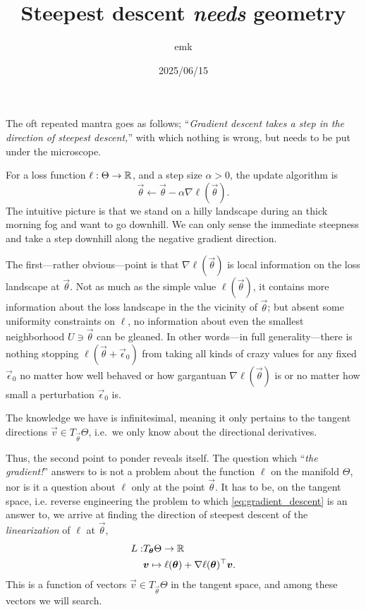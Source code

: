\documentclass[12pt]{amsart}
\title{Steepest descent \emph{needs} geometry}
\author{emk}
\date{2025/06/15}
\begin{document}
\maketitle

The oft repeated mantra goes as follows; ``\emph{Gradient descent takes a step in the direction of steepest descent,}'' with which nothing is wrong, but needs to be put under the microscope.

For a loss function $\ell : \Theta \to \mathbb{R}$, and a step size $\alpha > 0$, the update algorithm is
\begin{equation}\label{eq:gradient_descent}
	\vec{\theta} \leftarrow \vec{\theta} - \alpha \nabla \ell(\vec{\theta}).
\end{equation}
The intuitive picture is that we stand on a hilly landscape during an thick morning fog and want to go downhill. We can only sense the immediate steepness and take a step downhill along the negative gradient direction. 

The first---rather obvious---point is that $\nabla \ell(\vec{\theta})$ is local information on the loss landscape at $\vec{\theta}$. Not as much as the simple value $\ell(\vec{\theta})$, it contains more information about the loss landscape in the the vicinity of $\vec{\theta}$; but absent some uniformity constraints on $\ell$, no information about even the smallest neighborhood $U \ni \vec{\theta}$ can be gleaned. In other words---in full generality---there is nothing stopping $\ell(\vec{\theta} + \vec{\epsilon}_0)$ from taking all kinds of crazy values for any fixed $\vec{\epsilon}_0$ no matter how well behaved or how gargantuan $\nabla \ell(\vec{\theta})$ is or no matter how small a perturbation $\vec{\epsilon}_0$ is. 

The knowledge we have is infinitesimal, meaning it only pertains to the tangent directions $\vec{v} \in T_{\vec{\theta}}\Theta$, i.e.\ we only know about the directional derivatives. 

Thus, the second point to ponder reveals itself. The question which ``\emph{the gradient!}'' answers to is not a problem about the function $\ell$ on the manifold $\Theta$, nor is it a question about $\ell$ only at the point $\vec{\theta}$. It has to be, on the tangent space, i.e. reverse engineering the problem to which \eqref{eq:gradient_descent} is an answer to, we arrive at finding the direction of steepest descent of the  \emph{linearization} of $\ell$ at $\vec{\theta}$, 
\begin{align*}
L:& T_{\mathbf{\boldsymbol{\theta}}}\Theta \rightarrow  \mathbb{R}\\
&\mathbf{\boldsymbol{v}} \mapsto \ell(\mathbf{\boldsymbol{\theta}}) + \nabla \ell(\mathbf{\boldsymbol{\theta}})^\top \mathbf{\boldsymbol{v}}.
\end{align*} 
This is a function of vectors $\vec{v} \in T_{\vec{\theta}}\Theta$ in the tangent space, and among these vectors we will search.
 
\end{document}

